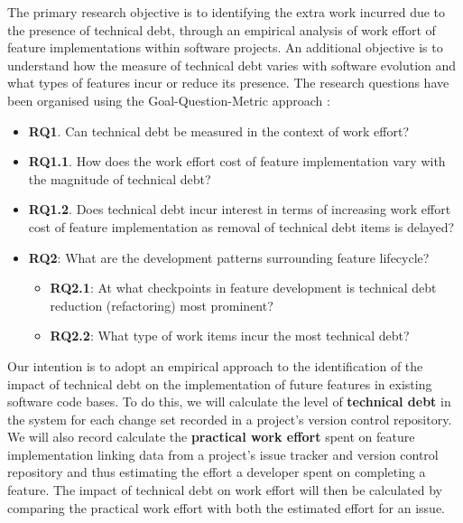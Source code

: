 The primary research objective is to identifying the extra work incurred due to
the presence of technical debt, through an empirical analysis of work effort of
feature implementations within software projects.  An additional objective is to
understand how the measure of technical debt varies with software evolution and
what types of features incur or reduce its presence.  The research questions
have been organised using the Goal-Question-Metric approach
\cite{VanSolingen2002}:

\begin{itemize}
	\item \textbf{RQ1}. Can technical debt be measured in the context of work
	      effort?

	\item \textbf{RQ1.1}. How does the work effort cost of feature implementation
              vary with the magnitude of technical debt? 

        \item \textbf{RQ1.2}. Does technical debt incur interest in terms of increasing
              work effort cost of feature implementation as removal of technical debt 
              items is delayed?

	\item \textbf{RQ2}: What are the development patterns surrounding feature
	      lifecycle?
	      \begin{itemize}
		      \item \textbf{RQ2.1}: At what checkpoints in feature development
		            is technical debt reduction (refactoring) most prominent?
		      \item \textbf{RQ2.2}: What type of work items incur the most
		            technical debt?
	      \end{itemize}
\end{itemize}

Our intention is to adopt an empirical approach to the identification of the
impact of technical debt on the implementation of future features in existing
software code bases.  To do this, we will calculate the level of
\textbf{technical debt} in the system for each change set recorded in a
project's version control repository.  We will also record calculate the
\textbf{practical work effort} spent on feature implementation linking data from
a project's issue tracker and version control repository and thus estimating the
effort a developer spent on completing a feature.  The impact of technical debt
on work effort will then be calculated by comparing the practical work effort
with both the estimated effort for an issue.

